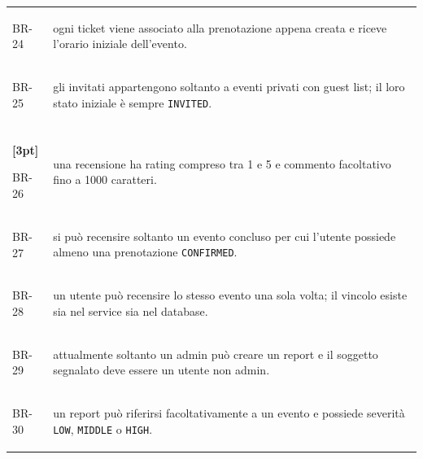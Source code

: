 \begin{longtable}{@{}>{\raggedright\arraybackslash\bfseries}p{1.4cm}>{\raggedright\arraybackslash}p{\dimexpr\textwidth-1.4cm-2\tabcolsep\relax}@{}}
\strut\label{br:BR-24}BR-24 & ogni ticket viene associato alla prenotazione appena creata e riceve l'orario iniziale dell'evento. \\[4pt]
\strut\label{br:BR-25}BR-25 & gli invitati appartengono soltanto a eventi privati con guest list; il loro stato iniziale è sempre \texttt{INVITED}. \\[4pt]
\rowcolor{etichetteUC}
\multicolumn{2}{@{}l}{\rule{0pt}{2.6ex}\textbf{Feedback e moderazione}} \\*[3pt]
\strut\label{br:BR-26}BR-26 & una recensione ha rating compreso tra 1 e 5 e commento facoltativo fino a 1000 caratteri. \\[4pt]
\strut\label{br:BR-27}BR-27 & si può recensire soltanto un evento concluso per cui l'utente possiede almeno una prenotazione \texttt{CONFIRMED}. \\[4pt]
\strut\label{br:BR-28}BR-28 & un utente può recensire lo stesso evento una sola volta; il vincolo esiste sia nel service sia nel database. \\[4pt]
\strut\label{br:BR-29}BR-29 & attualmente soltanto un admin può creare un report e il soggetto segnalato deve essere un utente non admin. \\[4pt]
\strut\label{br:BR-30}BR-30 & un report può riferirsi facoltativamente a un evento e possiede severità \texttt{LOW}, \texttt{MIDDLE} o \texttt{HIGH}. \\[4pt]
\end{longtable}
\endgroup
